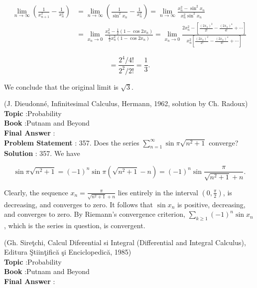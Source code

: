 \documentclass[10pt]{article}
\begin{document}
$$
\begin{aligned}
\lim _{n \rightarrow \infty}\left(\frac{1}{x_{n+1}^{2}}-\frac{1}{x_{n}^{2}}\right) &=\lim _{n \rightarrow \infty}\left(\frac{1}{\sin ^{2} x_{n}}-\frac{1}{x_{n}^{2}}\right)=\lim _{n \rightarrow \infty} \frac{x_{n}^{2}-\sin ^{2} x_{n}}{x_{n}^{2} \sin ^{2} x_{n}} \\
&=\lim _{x_{n} \rightarrow 0} \frac{x_{n}^{2}-\frac{1}{2}\left(1-\cos 2 x_{n}\right)}{\frac{1}{2} x_{n}^{2}\left(1-\cos 2 x_{n}\right)}=\lim _{x_{n} \rightarrow 0} \frac{2 x_{n}^{2}-\left[\frac{\left(2 x_{n}\right)^{2}}{2 !}-\frac{\left(2 x_{n}\right)^{4}}{4 !}+\cdots\right]}{x_{n}^{2}\left[\frac{\left(2 x_{n}\right)^{2}}{2 !}-\frac{\left(2 x_{n}\right)^{4}}{4 !}+\cdots\right]}
\end{aligned}
$$



$$
=\frac{2^{4} / 4 !}{2^{2} / 2 !}=\frac{1}{3} .
$$

We conclude that the original limit is $\sqrt{3}$.

(J. Dieudonné, Infinitesimal Calculus, Hermann, 1962, solution by Ch. Radoux)
\\
\textbf{Topic} :Probability\\
\textbf{Book} :Putnam and Beyond\\
\textbf{Final Answer} :\\


\textbf{Problem Statement} :
357. Does the series $\sum_{n=1}^{\infty} \sin \pi \sqrt{n^{2}+1}$ converge?
\\
\textbf{Solution} :
357. We have

$$
\sin \pi \sqrt{n^{2}+1}=(-1)^{n} \sin \pi\left(\sqrt{n^{2}+1}-n\right)=(-1)^{n} \sin \frac{\pi}{\sqrt{n^{2}+1}+n} .
$$

Clearly, the sequence $x_{n}=\frac{\pi}{\sqrt{n^{2}+1}+n}$ lies entirely in the interval $\left(0, \frac{\pi}{2}\right)$, is decreasing, and converges to zero. It follows that $\sin x_{n}$ is positive, decreasing, and converges to zero. By Riemann's convergence criterion, $\sum_{k \geq 1}(-1)^{n} \sin x_{n}$, which is the series in question, is convergent.

(Gh. Sireţchi, Calcul Diferential si Integral (Differential and Integral Calculus), Editura Ştiinţifică şi Enciclopedică, 1985)
\\
\textbf{Topic} :Probability\\
\textbf{Book} :Putnam and Beyond\\
\textbf{Final Answer} :\\
\end{document}
